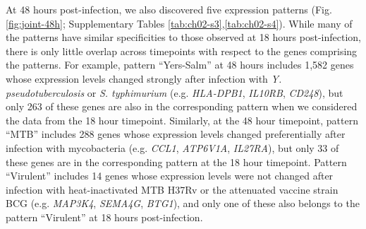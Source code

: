At 48 hours post-infection, we also discovered five expression
patterns (Fig. \ref{fig:joint-48h}; Supplementary Tables
\ref{tab:ch02-s3},\ref{tab:ch02-s4}). While many of the patterns have
similar specificities to those observed at 18 hours post-infection,
there is only little overlap across timepoints with respect to the
genes comprising the patterns. For example, pattern ``Yers-Salm'' at
48 hours includes 1,582 genes whose expression levels changed strongly
after infection with \emph{Y. pseudotuberculosis} or
\emph{S. typhimurium} (e.g. \emph{HLA-DPB1}, \emph{IL10RB},
\emph{CD248}), but only 263 of these genes are also in the
corresponding pattern when we considered the data from the 18 hour
timepoint. Similarly, at the 48 hour timepoint, pattern ``MTB''
includes 288 genes whose expression levels changed preferentially
after infection with mycobacteria (e.g. \emph{CCL1}, \emph{ATP6V1A},
\emph{IL27RA}), but only 33 of these genes are in the corresponding
pattern at the 18 hour timepoint. Pattern ``Virulent'' includes 14
genes whose expression levels were not changed after infection with
heat-inactivated MTB H37Rv or the attenuated vaccine strain BCG
(e.g. \emph{MAP3K4}, \emph{SEMA4G}, \emph{BTG1}), and only one of
these also belongs to the pattern ``Virulent'' at 18 hours
post-infection.

